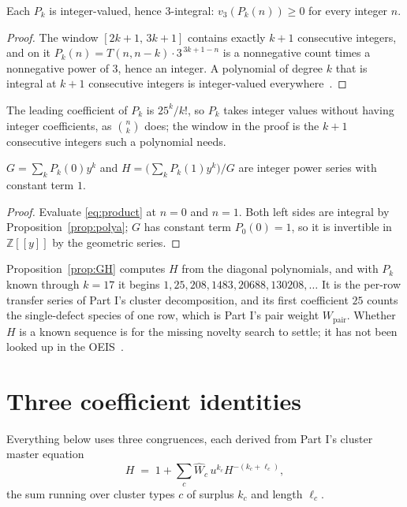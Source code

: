 \documentclass[11pt]{article}
\newcommand{\Wp}{W_{\mathrm{pair}}}
\newcommand{\Z}{\mathbb{Z}}
\newcommand{\vthree}{v_3}
\begin{document}
\begin{proposition}
\label{prop:polya}
Each $P_k$ is integer-valued, hence $3$-integral: $\vthree(P_k(n)) \ge 0$ for
every integer $n$.
\end{proposition}

\begin{proof}
The window $[2k+1,\,3k+1]$ contains exactly $k+1$ consecutive integers, and on
it $P_k(n) = T(n,n-k)\cdot 3^{\,3k+1-n}$ is a nonnegative count times a
nonnegative power of $3$, hence an integer. A polynomial of degree $k$ that is
integral at $k+1$ consecutive integers is integer-valued
everywhere~\cite{polya1915}.
\end{proof}

The leading coefficient of $P_k$ is $25^k/k!$, so $P_k$ takes integer values
without having integer coefficients, as $\binom{n}{k}$ does; the window in the
proof is the $k+1$ consecutive integers such a polynomial needs.

\begin{proposition}
\label{prop:GH}
$G = \sum_k P_k(0)y^k$ and $H = \bigl(\sum_k P_k(1)y^k\bigr)/G$ are integer power
series with constant term $1$.
\end{proposition}

\begin{proof}
Evaluate \eqref{eq:product} at $n = 0$ and $n = 1$. Both left sides are integral
by Proposition~\ref{prop:polya}; $G$ has constant term $P_0(0) = 1$, so it is
invertible in $\Z[[y]]$ by the geometric series.
\end{proof}

Proposition~\ref{prop:GH} computes $H$ from the diagonal polynomials, and with
$P_k$ known through $k = 17$ it begins $1, 25, 208, 1483, 20688, 130208, \dots$
It is the per-row transfer series of Part I's cluster decomposition, and its
first coefficient $25$ counts the single-defect species of one row, which is
Part I's pair weight $\Wp$. Whether $H$ is a known sequence is for the missing novelty search
to settle; it has not been looked up in the OEIS~\cite{oeis}.

\section{Three coefficient identities}
\label{sec:ladder}

Everything below uses three congruences, each derived from Part I's cluster master
equation
\[
  H \;=\; 1 + \sum_c \widehat W_c\, u^{k_c} H^{-(k_c+\ell_c)} ,
\]
the sum running over cluster types $c$ of surplus $k_c$ and length $\ell_c$.
\end{document}
